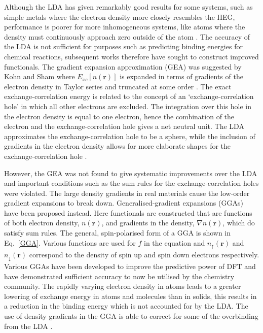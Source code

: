 \documentclass[11pt, twoside]{report}
\begin{document}
Although the LDA has given remarkably good results for some systems, such as simple metals where the electron density more closely resembles the HEG, performance is poorer for more inhomogeneous systems, like atoms where the density must continuously approach zero outside of the atom \cite{RichardMartin_Ch8}. The accuracy of the LDA is not sufficient for purposes such as predicting binding energies for chemical reactions, subsequent works therefore have sought to construct improved functionals. 
The gradient expansion approximation (GEA) was suggested by Kohn and Sham \cite{Kohn_Sham1965} where $E_{xc}[n(\mathbf{r})]$ is expanded in terms of gradients of the electron density in Taylor series and truncated at some order \cite{Prasad_ch3}.
The exact exchange-correlation energy is related to the concept of an `exchange-correlation hole' in which all other electrons are excluded. The integration over this hole in the electron density is equal to one electron, hence the combination of the electron and the exchange-correlation hole gives a net neutral unit. The LDA approximates the exchange-correlation hole to be a sphere, while the inclusion of gradients in the electron density allows for more elaborate shapes for the exchange-correlation hole \cite{RichardMartin_Ch7}.

However, the GEA was not found to give systematic improvements over the LDA and important conditions such as the sum rules for the exchange-correlation holes were violated. The large density gradients in real materials cause the low-order gradient expansions to break down. 
Generalised-gradient expansions (GGAs) have been proposed instead.
Here functionals are constructed that are functions of both electron density, $n(\mathbf{r})$, and gradients in the density, $\nabla n(\mathbf{r})$, which do satisfy sum rules. The general, spin-polarised form of a GGA is shown in Eq.~\ref{GGA}. Various functions are used for $f$ in the equation and $n_{\uparrow}(\mathbf{r})$ and $n_{\downarrow}(\mathbf{r})$ correspond to the density of spin up and spin down electrons respectively.
Various GGAs have been developed to improve the predictive power of DFT and have demonstrated sufficient accuracy to now be utilised by the chemistry community.
The rapidly varying electron density in atoms leads to a greater lowering of exchange energy in atoms and molecules than in solids, this results in a reduction in the binding energy which is not accounted for by the LDA. The use of density gradients in the GGA is able to correct for some of the overbinding from the LDA \cite{RichardMartin_Ch8}. 
\end{document}
